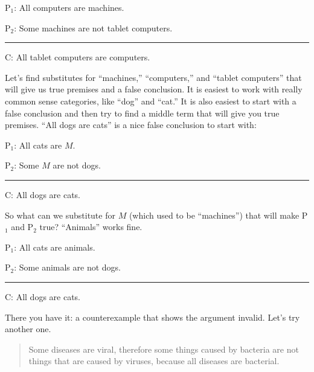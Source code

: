 {\begin{earg} 
\item[P$_1$:] All computers are machines.
\item[P$_2$:] Some machines are not tablet computers.
\vspace{-.5em} 
 \item [] \rule{0.4\linewidth}{.5pt} 
\item[C:] All tablet computers are computers.
 \end{earg}

Let's find substitutes for ``machines,'' ``computers,'' and ``tablet computers'' that will give us true premises and a false conclusion. It is easiest to work with really common sense categories, like ``dog'' and ``cat.'' It is also easiest to start with a false conclusion and then try to find a middle term that will give you true premises. ``All dogs are cats'' is a nice false conclusion to start with:  

\begin{earg} 
\item[P$_1$:] All cats are $M$.
\item[P$_2$:] Some $M$ are not dogs. 
\vspace{-.5em} 
 \item [] \rule{0.3\linewidth}{.5pt} 
\item[C:] All dogs are cats.
 \end{earg}

So what can we substitute for $M$ (which used to be ``machines'') that will make P$_1$ and P$_2$ true? ``Animals'' works fine.

\begin{earg} 
\item[P$_1$:] All cats are animals.
\item[P$_2$:] Some animals are not dogs. 
\vspace{-.5em} 
 \item [] \rule{0.3\linewidth}{.5pt} 
\item[C:] All dogs are cats.
 \end{earg}

There you have it: a counterexample that shows the argument invalid. Let's try another one. 

\begin{quotation}
Some diseases are viral, therefore some things caused by bacteria are not things that are caused by viruses, because all diseases are bacterial.
\end{quotation}

}
